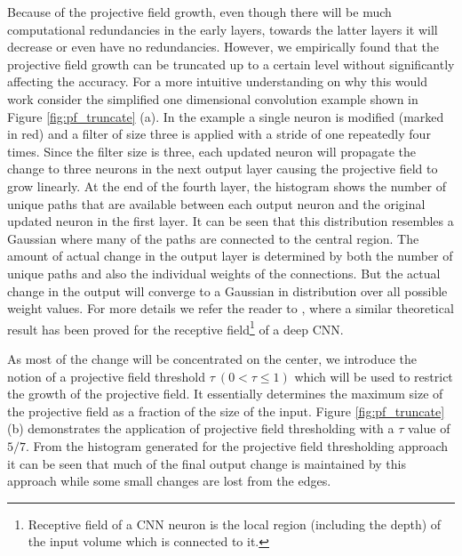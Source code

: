 Because of the projective field growth, even though there will be much computational redundancies in the early layers, towards the latter layers it will decrease or even have no redundancies.
However, we empirically found that the projective field growth can be truncated up to a certain level without significantly affecting the accuracy.
For a more intuitive understanding on why this would work consider the simplified one dimensional convolution example shown in Figure \ref{fig:pf_truncate} (a). In the example a single neuron is modified (marked in red) and a filter of size three is applied with a stride of one repeatedly four times.
Since the filter size is three, each updated neuron will propagate the change to three neurons in the next output layer causing the projective field to grow linearly.
At the end of the fourth layer, the histogram shows the number of unique paths that are available between each output neuron and the original updated neuron in the first layer.
It can be seen that this distribution resembles a Gaussian where many of the paths are connected to the central region.
The amount of actual change in the output layer is determined by both the number of unique paths and also the individual weights of the connections.
But the actual change in the output will converge to a Gaussian in distribution over all possible weight values.
For more details we refer the reader to \cite{luo2016understanding}, where a similar theoretical result has been proved for the receptive field\footnote{Receptive field of a CNN neuron is the local region (including the depth) of the input volume which is connected to it.} of a deep CNN.


As most of the change will be concentrated on the center, we introduce the notion of a projective field threshold $\tau ~ (0 < \tau \leq 1)$ which will be used to restrict the growth of the projective field.
It essentially determines the maximum size of the projective field as a fraction of the size of the input.
Figure \ref{fig:pf_truncate} (b) demonstrates the application of projective field thresholding with a $\tau$ value of $5/7$.
From the histogram generated for the projective field thresholding approach it can be seen that much of the final output change is maintained by this approach while some small changes are lost from the edges.

